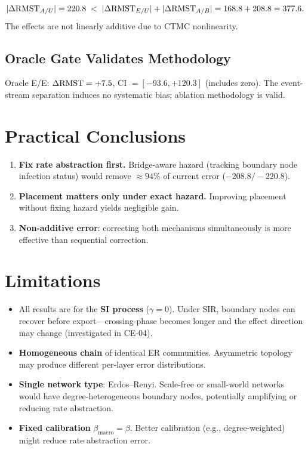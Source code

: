 \documentclass[11pt,a4paper]{article}
\begin{document}
\[
  |\Delta\mathrm{RMST}_{A/U}| = 220.8
  \;<\;
  |\Delta\mathrm{RMST}_{E/U}| + |\Delta\mathrm{RMST}_{A/B}| = 168.8 + 208.8 = 377.6.
\]
The effects are not linearly additive due to CTMC nonlinearity.

\subsection{Oracle Gate Validates Methodology}

Oracle E/E: $\Delta\mathrm{RMST} = +7.5$, CI $= [-93.6, +120.3]$ (includes zero).
The event-stream separation induces no systematic bias; ablation methodology
is valid.

\section{Practical Conclusions}

\begin{enumerate}
  \item \textbf{Fix rate abstraction first.}
        Bridge-aware hazard (tracking boundary node infection status)
        would remove $\approx 94\%$ of current error ($-208.8 / -220.8$).
  \item \textbf{Placement matters only under exact hazard.}
        Improving placement without fixing hazard yields negligible gain.
  \item \textbf{Non-additive error}: correcting both mechanisms simultaneously
        is more effective than sequential correction.
\end{enumerate}

\section{Limitations}

\begin{itemize}
  \item All results are for the \textbf{SI process} ($\gamma = 0$).
        Under SIR, boundary nodes can recover before export---crossing-phase
        becomes longer and the effect direction may change (investigated in CE-04).
  \item \textbf{Homogeneous chain} of identical ER communities.
        Asymmetric topology may produce different per-layer error distributions.
  \item \textbf{Single network type}: Erdos--Renyi. Scale-free or small-world
        networks would have degree-heterogeneous boundary nodes, potentially
        amplifying or reducing rate abstraction.
  \item \textbf{Fixed calibration} $\beta_{\mathrm{macro}} = \beta$.
        Better calibration (e.g., degree-weighted) might reduce rate abstraction error.
\end{itemize}
\end{document}
